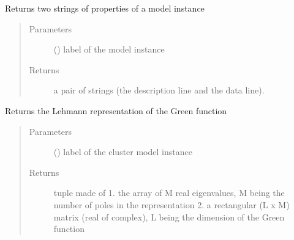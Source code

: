 \documentclass[letterpaper,10pt,english]{sphinxmanual}
\begin{document}
\begin{fulllineitems}
\label{\detokenize{functions:pyqcm.properties}}
\sphinxAtStartPar
Returns two strings of properties of a model instance
\begin{quote}\begin{description}
\item[{Parameters}] \leavevmode
\sphinxAtStartPar
{} () \textendash{} label of the model instance

\item[{Returns}] \leavevmode
\sphinxAtStartPar
a pair of strings (the description line and the data line).

\end{description}\end{quote}

\end{fulllineitems}


\begin{fulllineitems}
\label{\detokenize{functions:pyqcm.qmatrix}}
\sphinxAtStartPar
Returns the Lehmann representation of the Green function
\begin{quote}\begin{description}
\item[{Parameters}] \leavevmode
\sphinxAtStartPar
{} () \textendash{} label of the cluster model instance

\item[{Returns}] \leavevmode
{}\sphinxhyphen{}tuple made of
1. the array of M real eigenvalues, M being the number of poles in the representation
2. a rectangular (L x M) matrix (real of complex), L being the dimension of the Green function

\end{description}\end{quote}

\end{fulllineitems}
\end{document}
